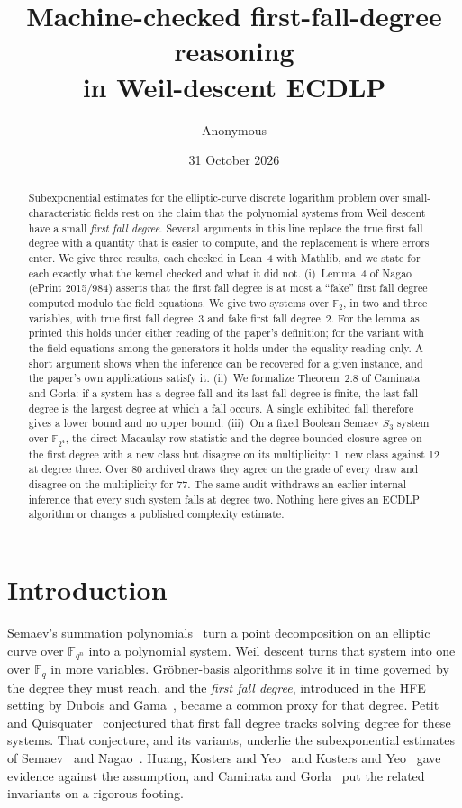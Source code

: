 \documentclass[11pt,a4paper]{article}
\title{Machine-checked first-fall-degree reasoning\\ in Weil-descent ECDLP}
\author{Anonymous}
\date{31 October 2026}
\theoremstyle{plain}
\theoremstyle{definition}
\theoremstyle{remark}
\newcommand{\FF}{\mathbb{F}}
\begin{document}
\maketitle

\begin{abstract}
Subexponential estimates for the elliptic-curve discrete logarithm problem over
small-characteristic fields rest on the claim that the polynomial systems from
Weil descent have a small \emph{first fall degree}. Several arguments in this
line replace the true first fall degree with a quantity that is easier to
compute, and the replacement is where errors enter. We give three results,
each checked in Lean~4 with Mathlib, and we state for each exactly what the
kernel checked and what it did not.
(i)~Lemma~4 of Nagao (ePrint 2015/984) asserts that the first fall degree is
at most a ``fake'' first fall degree computed modulo the field equations.
We give two systems over $\FF_2$, in two and three variables, with true first
fall degree~3 and fake first fall degree~2. For the lemma as printed this holds
under either reading of the paper's definition; for the variant with the field
equations among the generators it holds under the equality reading only. A short argument shows when the inference can be
recovered for a given instance, and the paper's own applications satisfy it.
(ii)~We formalize Theorem~2.8 of Caminata and Gorla: if a system has a degree
fall and its last fall degree is finite, the last fall degree is the largest
degree at which a fall occurs. A single exhibited fall therefore gives a lower
bound and no upper bound.
(iii)~On a fixed Boolean Semaev $S_3$ system over $\FF_{2^4}$, the direct
Macaulay-row statistic and the degree-bounded closure agree on the first
degree with a new class but disagree on its multiplicity: 1~new class against
12 at degree three. Over 80 archived draws they agree on the grade of every
draw and disagree on the multiplicity for 77. The same audit withdraws an
earlier internal inference that every such system falls at degree two.
Nothing here gives an ECDLP algorithm or changes a published complexity
estimate.
\end{abstract}

\section{Introduction}

Semaev's summation polynomials~\cite{semaev04} turn a point decomposition on an
elliptic curve over $\FF_{q^n}$ into a polynomial system. Weil descent turns
that system into one over $\FF_q$ in more variables. Gr\"obner-basis
algorithms solve it in time governed by the degree they must reach, and the
\emph{first fall degree}, introduced in the HFE setting by Dubois and
Gama~\cite{duboisgama}, became a common proxy for that degree. Petit and
Quisquater~\cite{petitquisquater} conjectured that first fall degree tracks
solving degree for these systems. That conjecture, and its variants, underlie
the subexponential estimates of Semaev~\cite{semaev15} and
Nagao~\cite{nagao13,nagao15}. Huang, Kosters and Yeo~\cite{hky} and Kosters and
Yeo~\cite{kostersyeo} gave evidence against the assumption, and Caminata and
Gorla~\cite{cg} put the related invariants on a rigorous footing.
\end{document}
